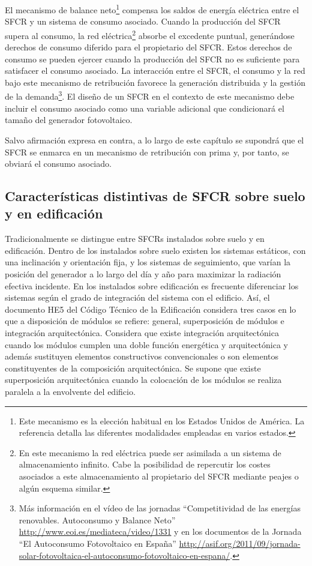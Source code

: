 El mecanismo de balance neto\footnote{Este mecanismo es la elección
habitual en los Estados Unidos de América. La referencia \cite{Chapman.Rose2011}
detalla las diferentes modalidades empleadas en varios estados.} compensa los saldos de energía eléctrica
entre el SFCR y un sistema de consumo asociado. Cuando la producción
del SFCR supera al consumo, la red eléctrica\footnote{En este
  mecanismo la red eléctrica puede ser asimilada a un sistema de
  almacenamiento infinito. Cabe la posibilidad de repercutir los
  costes asociados a este almacenamiento al propietario del SFCR
  mediante peajes o algún esquema similar.} absorbe el excedente
puntual, generándose derechos de consumo diferido para el propietario
del SFCR. Estos derechos de consumo se pueden ejercer cuando la
producción del SFCR no es suficiente para satisfacer el consumo
asociado. La interacción entre el SFCR, el consumo y la red bajo este
mecanismo de retribución favorece la generación distribuida y la
gestión de la demanda\footnote{Más información en el vídeo de las
  jornadas ``Competitividad de las energías renovables. Autoconsumo y
  Balance Neto'' \url{http://www.eoi.es/mediateca/video/1331} y en los
  documentos de la Jornada ``El Autoconsumo Fotovoltaico en España''
  \url{http://asif.org/2011/09/jornada-solar-fotovoltaica-el-autoconsumo-fotovoltaico-en-espana/}.}.
El diseño de un SFCR en el contexto de este mecanismo debe incluir el
consumo asociado como una variable adicional que condicionará el
tamaño del generador fotovoltaico. 

Salvo afirmación expresa en contra, a lo largo de este capítulo se
supondrá que el SFCR se enmarca en un mecanismo de retribución con
prima y, por tanto, se obviará el consumo asociado.

\subsection{Características distintivas de SFCR sobre suelo y en edificación}

Tradicionalmente se distingue entre SFCRs instalados sobre suelo y
en edificación. Dentro de los instalados sobre suelo existen los sistemas
estáticos, con una inclinación y orientación fija, y los sistemas
de seguimiento, que varían la posición del generador a lo largo del
día y año para maximizar la radiación efectiva incidente. En los instalados
sobre edificación es frecuente diferenciar los sistemas según el grado
de integración del sistema con el edificio. Así, el documento HE5
del Código Técnico de la Edificación considera tres casos en lo que
a disposición de módulos se refiere: general, superposición de módulos
e integración arquitectónica. Considera que existe integración arquitectónica
cuando los módulos cumplen una doble función energética y arquitectónica
y además sustituyen elementos constructivos convencionales o son elementos
constituyentes de la composición arquitectónica. Se supone que existe
superposición arquitectónica cuando la colocación de los módulos se
realiza paralela a la envolvente del edificio.



